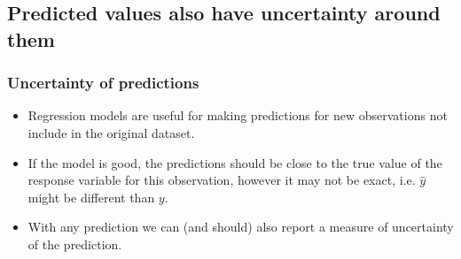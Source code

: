 \documentclass[slidestop,compress,mathserif,12pt,t,professionalfonts,xcolor=table]{beamer}
\begin{document}

\subsection{Predicted values also have uncertainty around them}
\label{mi2}


\begin{frame}
\frametitle{Uncertainty of predictions}

\begin{itemize}

\item Regression models are useful for making predictions for new observations not include in the original dataset.

\pause

\item If the model is good, the predictions should be close to the true value of the response variable for this observation, 
however it may not be exact, i.e. $\hat{y}$ might be different than $y$.

\pause

\item With any prediction we can (and should) also report a measure of uncertainty of the prediction.

\end{itemize}

\end{frame}

\end{document}
